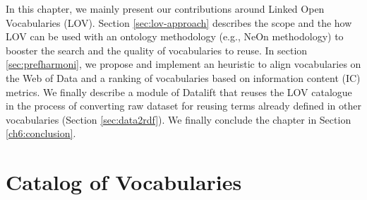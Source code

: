 In this chapter, we mainly present our contributions around Linked Open Vocabularies (LOV). Section \ref{sec:lov-approach} describes the scope and the how LOV can be used with an ontology methodology (e.g., NeOn methodology) to booster the search and the quality of vocabularies to reuse. In section \ref{sec:prefharmoni}, we propose and implement an heuristic to align vocabularies on the Web of Data and a ranking of vocabularies based on information content (IC) metrics. We finally describe a module of Datalift that reuses the LOV catalogue in the process of converting raw dataset for reusing terms already defined in other vocabularies (Section \ref{sec:data2rdf}). We finally conclude the chapter in Section \ref{ch6:conclusion}.



\section{Catalog of Vocabularies}
\label{sec:catalog}

